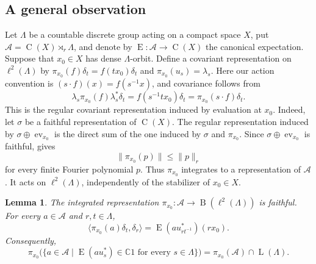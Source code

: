 \documentclass[11pt]{amsart}
\numberwithin{equation}{section}
\newcommand{\C}{\mathbb{C}}
\newcommand{\rL}{\operatorname{L}}
\newcommand{\rB}{\operatorname{B}}
\newcommand{\rC}{\operatorname{C}}
\newcommand{\rE}{\operatorname{E}}
\newtheorem{lemma}[theorem]{Lemma}
\theoremstyle{definition}
\begin{document}
	\subsection{A general observation}
	
	Let \(\Lambda\) be a countable discrete group acting on a compact space \(X\), put \(\mathcal A=\rC(X)\rtimes_r\Lambda\), and denote by \(\rE:\mathcal A\to\rC(X)\) the canonical expectation. Suppose that \(x_0\in X\) has dense \(\Lambda\)-orbit. Define a covariant representation on \(\ell^2(\Lambda)\) by \(\pi_{x_0}(f)\delta_t=f(tx_0)\delta_t\) and \(\pi_{x_0}(u_s)=\lambda_s\).
	Here our action convention is \((s\cdot f)(x)=f(s^{-1}x)\), and covariance follows from
	\[
	\lambda_s\pi_{x_0}(f)\lambda_s^*\delta_t
	=f(s^{-1}tx_0)\delta_t
	=\pi_{x_0}(s\cdot f)\delta_t.
	\]
	This is the regular covariant representation induced by evaluation at \(x_0\). Indeed, let \(\sigma\) be a faithful representation of \(\rC(X)\). The regular representation induced by \(\sigma\oplus\operatorname{ev}_{x_0}\) is the direct sum of the one induced by \(\sigma\) and \(\pi_{x_0}\). Since \(\sigma\oplus\operatorname{ev}_{x_0}\) is faithful, \cite[Proposition~4.1.5]{BO08} gives
	\[
		\|\pi_{x_0}(p)\|\leq\|p\|_r
	\]
	for every finite Fourier polynomial \(p\). Thus \(\pi_{x_0}\) integrates to a representation of \(\mathcal A\). It acts on \(\ell^2(\Lambda)\), independently of the stabilizer of \(x_0 \in X\).
	
	\begin{lemma}\label{lem:itap-orbit-representation}
		The integrated representation \(\pi_{x_0}:\mathcal A\to\rB(\ell^2(\Lambda))\) is faithful. For every \(a\in\mathcal A\) and \(r,t\in\Lambda\),
		\begin{equation}\label{eq:itap-matrix-coefficient}
			\langle\pi_{x_0}(a)\delta_t,\delta_r\rangle
			=
			\rE(au_{rt^{-1}}^*)(rx_0).
		\end{equation}
		Consequently,
		\begin{equation}\label{eq:itap-boundary-intersection}
			\pi_{x_0}\bigl(\{a\in\mathcal A\mid
			\rE(au_s^*)\in\C1\text{ for every }s\in\Lambda\}\bigr)
			=
			\pi_{x_0}(\mathcal A)\cap\rL(\Lambda).
		\end{equation}
	\end{lemma}
	
\end{document}
